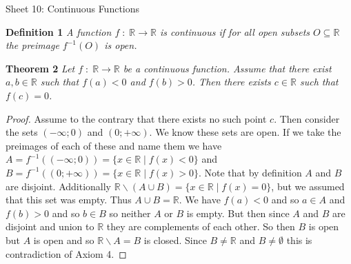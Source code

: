 \documentclass{article}
\begin{document}
\begin{flushleft}

\Large

Sheet 10: Continuous Functions\newline

\normalsize

\textbf{Definition 1}
\textsl{A function $f \; : \; \mathbb{R} \rightarrow \mathbb{R}$ is continuous if for all open subsets $O \subseteq \mathbb{R}$ the preimage $f^{-1} (O)$ is open.}\newline

\textbf{Theorem 2}
\textsl{Let $f \; : \; \mathbb{R} \rightarrow \mathbb{R}$ be a continuous function. Assume that there exist $a,b \in \mathbb{R}$ such that $f(a)<0$ and $f(b)>0$. Then there exists $c \in \mathbb{R}$ such that $f(c)=0$.}
\begin{proof}
Assume to the contrary that there exists no such point $c$. Then consider the sets $(- \infty ; 0)$ and $(0 ; + \infty)$. We know these sets are open. If we take the preimages of each of these and name them we have $A=f^{-1} ((- \infty ; 0)) = \{x \in \mathbb{R} \mid f(x) < 0\}$ and $B=f^{-1} ((0 ; + \infty)) = \{x \in \mathbb{R} \mid f(x) > 0\}$. Note that by definition $A$ and $B$ are disjoint. Additionally $\mathbb{R} \backslash (A \cup B) = \{x \in \mathbb{R} \mid f(x)=0\}$, but we assumed that this set was empty. Thus $A \cup B = \mathbb{R}$. We have $f(a)<0$ and so $a \in A$ and $f(b)>0$ and so $b \in B$ so neither $A$ or $B$ is empty. But then since $A$ and $B$ are disjoint and union to $\mathbb{R}$ they are complements of each other. So then $B$ is open but $A$ is open and so $\mathbb{R} \backslash A=B$ is closed. Since $B \neq \mathbb{R}$ and $B \neq \emptyset$ this is contradiction of Axiom 4.
\end{proof}


\end{flushleft}
\end{document}
